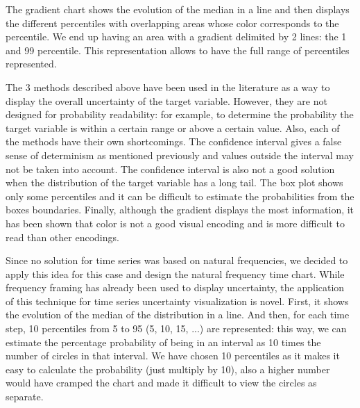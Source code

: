 \documentclass[a4paper,3p,sort&compress]{elsarticle}
\begin{document}
The gradient chart shows the evolution of the median in a line and then displays the different percentiles
with overlapping areas whose color corresponds to the percentile. We end up having an area with a gradient 
delimited by 2 lines: the 1 and 99 percentile. This representation allows to have the
 full range of percentiles represented.

The 3 methods described above have been used in the literature as a way to display the overall uncertainty 
of the target variable. However, they are not designed for probability readability: for example, to determine 
the probability the target variable is within a certain range or above a certain value. Also,
each of the methods have their own shortcomings. The confidence interval gives a false sense of determinism as mentioned previously
and values outside the interval may not be taken into account. The confidence interval is also not a good solution 
when the distribution of the target variable has a long tail. The box plot shows only some percentiles and it can be difficult to 
estimate the probabilities from the boxes boundaries. Finally, although the gradient displays the most information, it has been 
shown \cite{cleveland_graphical_1984} that color is not 
a good visual encoding and is more difficult to read than other encodings.

Since no solution for time series was based on natural frequencies, we decided to apply this idea for this case 
and design the natural frequency time chart.
While frequency framing has already been used to display uncertainty, the application of this technique for time series 
uncertainty visualization is novel. First, 
it shows the evolution of the median of the distribution in a line. And then, for each time 
step, 10 percentiles from 5 to 95 (5, 10, 15, ...) are represented: this way, we can estimate the percentage 
probability of being in an interval as 10 times the number of circles in that interval. 
We have chosen 10 percentiles as it makes it easy to calculate the probability (just multiply by 10), also a higher number
would have cramped the chart and made it difficult to view the circles as separate. 
\end{document}
